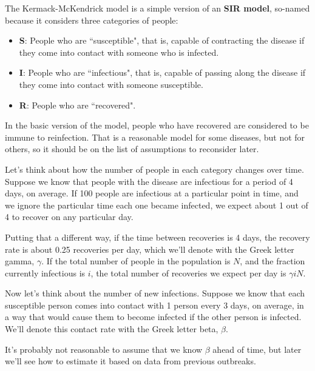 \documentclass[12pt]{book}
\theoremstyle{exercise}
\begin{document}
The Kermack-McKendrick model is a simple version of an {\bf SIR model}, so-named because it considers three categories of people:

\begin{itemize}

\item {\bf S}: People who are ``susceptible", that is, capable of contracting the disease if they come into contact with someone who is infected.

\item {\bf I}: People who are ``infectious", that is, capable of passing along the disease if they come into contact with someone susceptible.

\item {\bf R}: People who are ``recovered".

\end{itemize}
 
In the basic version of the model, people who have recovered are considered to be immune to reinfection.  That is a reasonable model for some diseases, but not for others, so it should be on the list of assumptions to reconsider later.

Let's think about how the number of people in each category changes over time.  Suppose we know that people with the disease are infectious for a period of 4 days, on average.  If 100 people are infectious at a particular point in time, and we ignore the particular time each one became infected, we expect about 1 out of 4 to recover on any particular day.

Putting that a different way, if the time between recoveries is 4 days, the recovery rate is about 0.25 recoveries per day, which we'll denote with the Greek letter gamma, $\gamma$.  If the total number of people in the population is $N$, and the fraction currently infectious is $i$, the total number of recoveries we expect per day is $\gamma i N$.


Now let's think about the number of new infections.  Suppose we know that each susceptible person comes into contact with 1 person every 3 days, on average, in a way that would cause them to become infected if the other person is infected.  We'll denote this contact rate with the Greek letter beta, $\beta$.


It's probably not reasonable to assume that we know $\beta$ ahead of time, but later we'll see how to estimate it based on data from previous outbreaks.
\end{document}
